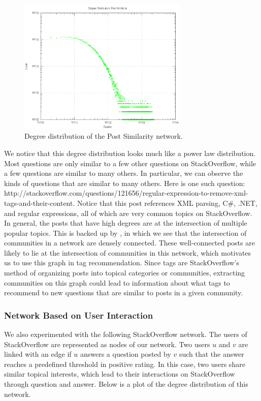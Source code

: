 \documentclass[11pt]{IEEEtran}
\begin{document}
\begin{figure}[h]
  \centering
    \includegraphics[width=3.2in]{similarity_degdistr.png}
  \caption{Degree distribution of the Post Similarity network.}
  \label{fig:post_dd}
\end{figure}

We notice that this degree distribution looks much like a power law distribution. Most questions are only similar to a few other questions on StackOverflow, while a few questions are similar to many others. In particular, we can observe the kinds of questions that are similar to many others. Here is one such question: http://stackoverflow.com/questions/121656/regular-expression-to-remove-xml-tags-and-their-content.
Notice that this post references XML parsing, C\#, .NET, and regular expressions, all of which are very common topics on StackOverflow. In general, the posts that have high degrees are at the intersection of multiple popular topics. This is backed up by \cite{8}, in which we see that the intersection of communities in a network are densely connected. These well-connected posts are likely to lie at the intersection of communities in this network, which motivates us to use this graph in tag recommendation. Since tags are StackOverflow’s method of organizing posts into topical categories or communities, extracting communities on this graph could lead to information about what tags to recommend to new questions that are similar to posts in a given community.

\subsubsection{Network Based on User Interaction}

We also experimented with the following StackOverflow network. The users of StackOverflow are represented as nodes of our network. Two users $u$ and $v$ are linked with an edge if $u$ answers a question posted by $v$ such that the answer reaches a predefined threshold in positive rating. In this case, two users share similar topical interests, which lead to their interactions on StackOverflow through question and answer. Below is a plot of the degree distribution of this network.
\end{document}
